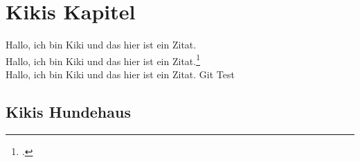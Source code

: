 \maketitle

\chapter{Kikis Kapitel}
Hallo, ich bin Kiki und das hier ist ein Zitat.\autocite{seiter2017business}\\
Hallo, ich bin Kiki und das hier ist ein Zitat.\footcite{seiter2017business}\\
Hallo, ich bin Kiki und das hier ist ein Zitat.\citeauthor{elk}
Git Test
\section{Kikis Hundehaus}


\printbibliography[nottype=online] 
\printbibliography[type=online, title={Internetquellen}] 

